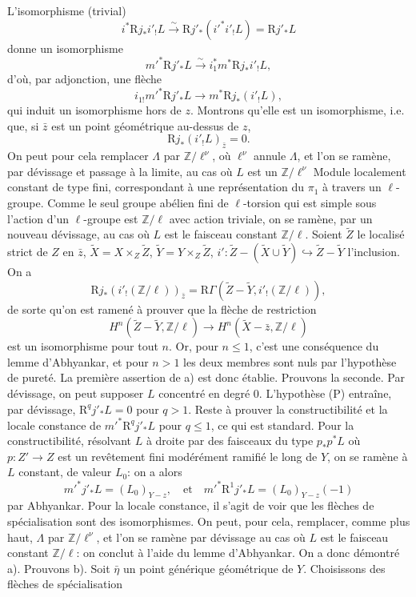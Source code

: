\documentclass[11pt]{article}
\newcommand{\R}{\mathrm{R}}\newcommand{\RHomCore}{\mathrm{RHom}}
\providecommand{\R}{\mathrm R}
\begin{document}
L'isomorphisme (trivial)
\[
i^*\R j_*i'_!L\xrightarrow{\sim}\R j'_*(i'^*i'_!L)=\R j'_*L
\]
donne un
isomorphisme
\[
m'^*\R j'_*L\xrightarrow{\sim} i_1^*m^*\R j_*i'_!L,
\]
d'où, par adjonction, une flèche
\[
i_{1!}m'^*\R j'_*L\longrightarrow m^*\R j_*(i'_!L),
\]
qui induit un isomorphisme hors de $z$. Montrons qu'elle est un isomorphisme, i.e. que, si $\bar z$ est un point géométrique au-dessus de $z$,
\[
\R j_*(i'_!L)_{\bar z}=0.
\]
On peut pour cela remplacer $\Lambda$ par $\mathbb Z/\ell^\nu$, où $\ell^\nu$ annule $\Lambda$, et l'on se ramène, par dévissage et passage à la limite, au cas où $L$ est un $\mathbb Z/\ell^\nu$ Module localement constant de type fini, correspondant à une représentation du $\pi_1$ à travers un $\ell$-groupe. Comme le seul groupe abélien fini de $\ell$-torsion qui est simple sous l'action d'un $\ell$-groupe est $\mathbb Z/\ell$ avec action triviale, on se ramène, par un nouveau dévissage, au cas où $L$ est le faisceau constant $\mathbb Z/\ell$. Soient $\widetilde Z$ le localisé strict de $Z$ en $\bar z$, $\widetilde X=X\times_Z\widetilde Z$, $\widetilde Y=Y\times_Z\widetilde Z$, $i':\widetilde Z-(\widetilde X\cup\widetilde Y)\hookrightarrow \widetilde Z-\widetilde Y$ l'inclusion. On a
\[
\R j_*(i'_!(\mathbb Z/\ell))_{\bar z}
=\R\Gamma(\widetilde Z-\widetilde Y,i'_!(\mathbb Z/\ell)),
\]
de sorte qu'on est ramené à prouver que la flèche de restriction
\[
H^n(\widetilde Z-\widetilde Y,\mathbb Z/\ell)
\longrightarrow
H^n(\widetilde X-\bar z,\mathbb Z/\ell)
\]
est un isomorphisme pour tout $n$. Or, pour $n\le1$, c'est une conséquence du lemme d'Abhyankar, et pour $n>1$ les deux membres sont nuls par l'hypothèse de pureté. La première assertion de a) est donc établie. Prouvons la seconde. Par dévissage, on peut supposer $L$ concentré en degré $0$. L'hypothèse (P) entraîne, par dévissage, $\R^qj'_*L=0$ pour $q>1$. Reste à prouver la constructibilité et la locale constance de $m'^*\R^qj'_*L$ pour $q\le1$, ce qui est standard. Pour la constructibilité, résolvant $L$ à droite par des faisceaux du type $p_*p^*L$ où $p:Z'\to Z$ est un revêtement fini modérément ramifié le long de $Y$, on se ramène à $L$ constant, de valeur $L_0$: on a alors
\[
m'^*j'_*L=(L_0)_{Y-z},
\quad\text{et}\quad
m'^*\R^1j'_*L=(L_0)_{Y-z}(-1)
\]
par Abhyankar. Pour la locale constance, il s'agit de voir que les flèches de spécialisation sont des isomorphismes. On peut, pour cela,
remplacer, comme plus haut, $\Lambda$ par $\mathbb Z/\ell^\nu$, et l'on se ramène par dévissage au cas où $L$ est le faisceau constant $\mathbb Z/\ell$: on conclut à l'aide du lemme d'Abhyankar. On a donc démontré a). Prouvons b). Soit $\bar\eta$ un point générique géométrique de $Y$. Choisissons des flèches de spécialisation
\end{document}
